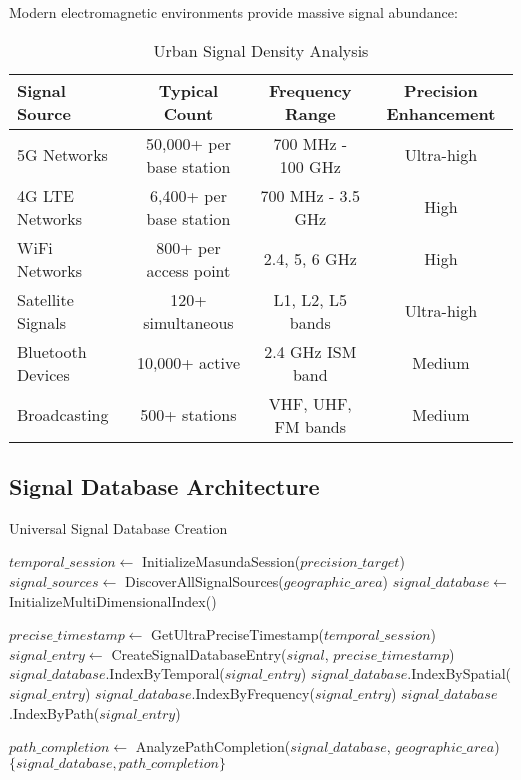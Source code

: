 \documentclass[12pt,a4paper]{article}
\begin{document}
Modern electromagnetic environments provide massive signal abundance:

\begin{table}[htbp]
\centering
\caption{Urban Signal Density Analysis}
\begin{tabular}{@{}lccc@{}}
\toprule
\textbf{Signal Source} & \textbf{Typical Count} & \textbf{Frequency Range} & \textbf{Precision Enhancement} \\
\midrule
5G Networks & 50,000+ per base station & 700 MHz - 100 GHz & Ultra-high \\
4G LTE Networks & 6,400+ per base station & 700 MHz - 3.5 GHz & High \\
WiFi Networks & 800+ per access point & 2.4, 5, 6 GHz & High \\
Satellite Signals & 120+ simultaneous & L1, L2, L5 bands & Ultra-high \\
Bluetooth Devices & 10,000+ active & 2.4 GHz ISM band & Medium \\
Broadcasting & 500+ stations & VHF, UHF, FM bands & Medium \\
\bottomrule
\end{tabular}
\end{table}

\subsection{Signal Database Architecture}

\begin{algorithm}
\caption{Universal Signal Database Creation}
\begin{algorithmic}[1]
    \State $temporal\_session \gets$ InitializeMasundaSession($precision\_target$)
    \State $signal\_sources \gets$ DiscoverAllSignalSources($geographic\_area$)
    \State $signal\_database \gets$ InitializeMultiDimensionalIndex()
    
        \State $precise\_timestamp \gets$ GetUltraPreciseTimestamp($temporal\_session$)
        \State $signal\_entry \gets$ CreateSignalDatabaseEntry($signal$, $precise\_timestamp$)
        \State $signal\_database$.IndexByTemporal($signal\_entry$)
        \State $signal\_database$.IndexBySpatial($signal\_entry$)
        \State $signal\_database$.IndexByFrequency($signal\_entry$)
        \State $signal\_database$.IndexByPath($signal\_entry$)
    \EndFor
    
    \State $path\_completion \gets$ AnalyzePathCompletion($signal\_database$, $geographic\_area$)
    \State \Return $\{signal\_database, path\_completion\}$
\EndProcedure
\end{algorithmic}
\end{algorithm}
\end{document}
